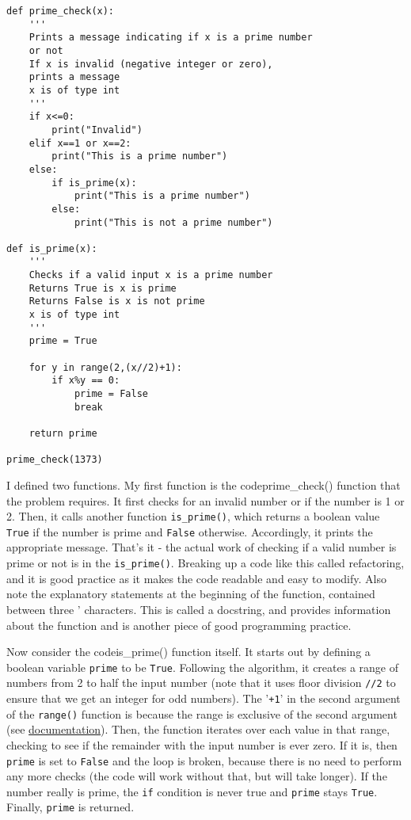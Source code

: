 \documentclass[12pt]{article}
\newcommand{\code}{\texttt}
\begin{document}
\begin{lstlisting}[frame=single] 
def prime_check(x):
    '''
    Prints a message indicating if x is a prime number
    or not
    If x is invalid (negative integer or zero), 
    prints a message
    x is of type int
    '''
    if x<=0:
        print("Invalid")
    elif x==1 or x==2:
        print("This is a prime number")
    else:
        if is_prime(x):
            print("This is a prime number")
        else:
            print("This is not a prime number")

def is_prime(x):
    '''
    Checks if a valid input x is a prime number
    Returns True is x is prime
    Returns False is x is not prime
    x is of type int
    '''
    prime = True
    
    for y in range(2,(x//2)+1):
        if x%y == 0:
            prime = False
            break
    
    return prime

prime_check(1373)
\end{lstlisting}

I defined two functions. My first function is the code{prime\_check()} function that the problem requires. It first checks for an invalid number or if the number is 1 or 2. Then, it calls another function \code{is\_prime()}, which returns a boolean value \code{True} if the number is prime and \code{False} otherwise. Accordingly, it prints the appropriate message. That's it - the actual work of checking if a valid number is prime or not is in the \code{is\_prime()}. Breaking up a code like this called refactoring, and it is good practice as it makes the code readable and easy to modify. Also note the explanatory statements at the beginning of the function, contained between three ' characters. This is called a docstring, and provides information about the function and is another piece of good programming practice.

Now consider the code{is\_prime()} function itself. It starts out by defining a boolean variable \code{prime} to be \code{True}. Following the algorithm, it creates a range of numbers from 2 to half the input number (note that it uses floor division \code{//2} to ensure that we get an integer for odd numbers). The '\code{+1}' in the second argument of the \code{range()} function is because the range is exclusive of the second argument (see \href{https://docs.python.org/3/library/functions.html#func-range}{documentation}). Then, the function iterates over each value in that range, checking to see if the remainder with the input number is ever zero. If it is, then \code{prime} is set to \code{False} and the loop is broken, because there is no need to perform any more checks (the code will work without that, but will take longer). If the number really is prime, the \code{if} condition is never true and \code{prime} stays \code{True}. Finally, \code{prime} is returned.
\end{document}
